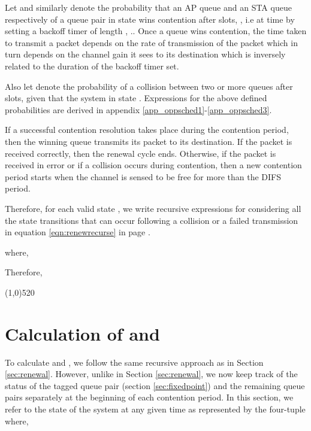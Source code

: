 \documentclass[10pt,conference]{IEEEtran}
\begin{document}
  Let  and similarly  denote the probability that an AP queue and an STA queue respectively of a queue pair in state  wins contention after  slots,  ,
 i.e at time  by setting a backoff timer of length ,  .. Once a queue wins contention, the time taken to transmit a packet depends on the rate of transmission of the packet  which in turn depends on the channel gain it sees to its destination 
which is inversely related to the duration of the backoff timer set.
 


 Also let  denote the probability of a collision between two or more queues after  slots,   given that the system in state .
Expressions for the above defined probabilities are derived in appendix \ref{app_oppsched1}-\ref{app_oppsched3}.

    If a successful contention resolution takes place during the contention period, then the winning queue transmits its packet to its destination. If the packet is received correctly, then the renewal cycle ends. Otherwise, if the packet is received in 
error or if a collision occurs during contention, then a new contention period starts when the channel is 
sensed to be free for more than the DIFS period. 


 Therefore, for each valid state , we write recursive expressions for  considering all the state transitions that can occur following a collision or a failed transmission in equation \ref{eqn:renewrecurse} in page \pageref{eqn:renewrecurse}.
 
 \begin{figure*}



where,






Therefore,



     \line(1,0){520}
     \end{figure*}
     
\section{Calculation of  and }
\label{sec:fixednum}


	To calculate  and , we follow the same recursive approach as in Section \ref{sec:renewal}.
 However, unlike in Section \ref{sec:renewal}, we now keep track of the status of the tagged queue pair (section \ref{sec:fixedpoint}) and the remaining  queue pairs separately at the beginning of each contention period.
In this section, we refer to the state of the system at any given time as represented by the  four-tuple   
 where,
	
\end{document}
